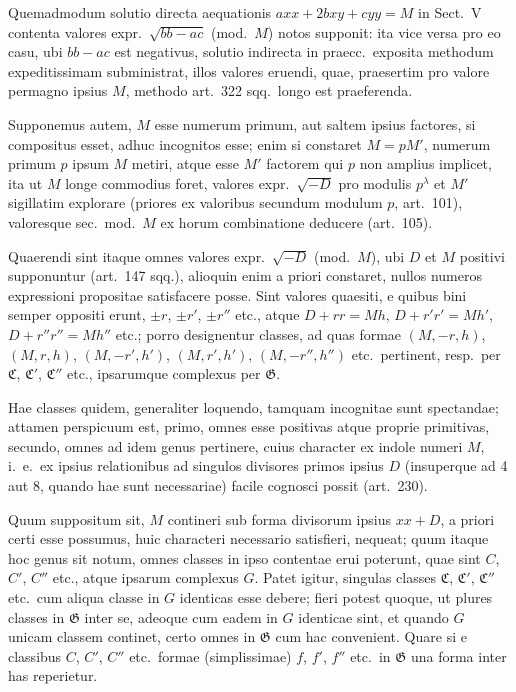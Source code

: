 \documentclass[12pt,a4paper]{article}
\theoremstyle{plain}
\theoremstyle{definition}
\theoremstyle{remark}
\begin{document}
Quemadmodum solutio directa aequationis $axx+2bxy+cyy=M$ in
Sect.\ V contenta valores expr.\ $\sqrt{bb-ac}$ (mod.\ $M$) notos supponit: ita
vice versa pro eo casu, ubi $bb-ac$ est negativus, solutio indirecta in
praecc.\ exposita methodum expeditissimam subministrat, illos valores
eruendi, quae, praesertim pro valore permagno ipsius $M$, methodo art.\ 322
sqq.\ longo est praeferenda.

Supponemus autem, $M$ esse numerum primum, aut saltem ipsius
factores, si compositus esset, adhuc incognitos esse; enim si constaret
$M=pM'$, numerum primum $p$ ipsum $M$ metiri, atque esse $M'$ factorem
qui $p$ non amplius implicet, ita ut $M$ longe commodius foret, valores expr.\ $\sqrt{-D}$ pro modulis $p^\lambda$ et $M'$ sigillatim explorare (priores ex valoribus
secundum modulum $p$, art.\ 101), valoresque sec.\ mod.\ $M$ ex horum
combinatione deducere (art.\ 105).

Quaerendi sint itaque omnes valores expr.\ $\sqrt{-D}$ (mod.\ $M$), ubi $D$ et
$M$ positivi supponuntur (art.\ 147 sqq.), alioquin enim a priori constaret,
nullos numeros expressioni propositae satisfacere posse. Sint valores quaesiti,
e quibus bini semper oppositi erunt, $\pm r$, $\pm r'$, $\pm r''$ etc., atque $D+rr=Mh$,
$D+r'r'=Mh'$, $D+r''r''=Mh''$ etc.; porro designentur classes, ad quas
formae $(M,-r,h)$, $(M,r,h)$, $(M,-r',h')$, $(M,r',h')$, $(M,-r'',h'')$
etc.\ pertinent, resp.\ per $\mathfrak{C}$, $\mathfrak{C}'$, $\mathfrak{C}''$ etc., ipsarumque complexus per $\mathfrak{G}$.

Hae classes quidem, generaliter loquendo, tamquam incognitae sunt
spectandae; attamen perspicuum est, primo, omnes esse positivas atque
proprie primitivas, secundo, omnes ad idem genus pertinere, cuius character
ex indole numeri $M$, i.\ e.\ ex ipsius relationibus ad singulos divisores primos
ipsius $D$ (insuperque ad 4 aut 8, quando hae sunt necessariae) facile
cognosci possit (art.\ 230).

Quum suppositum sit, $M$ contineri sub forma divisorum ipsius
$xx+D$, a priori certi esse possumus, huic characteri necessario satisfieri,
nequeat; quum itaque hoc genus sit notum, omnes classes in ipso contentae
erui poterunt, quae sint $C$, $C'$, $C''$ etc., atque ipsarum complexus $G$.
Patet igitur, singulas classes $\mathfrak{C}$, $\mathfrak{C}'$, $\mathfrak{C}''$ etc.\ cum aliqua classe in
$G$ identicas esse debere; fieri potest quoque, ut plures classes in $\mathfrak{G}$
inter se, adeoque cum eadem in $G$ identicae sint, et quando $G$ unicam
classem continet, certo omnes in $\mathfrak{G}$ cum hac convenient. Quare si e
classibus $C$, $C'$, $C''$ etc.\ formae (simplissimae) $f$, $f'$, $f''$ etc.\ in
$\mathfrak{G}$ una forma inter has reperietur.
\end{document}
